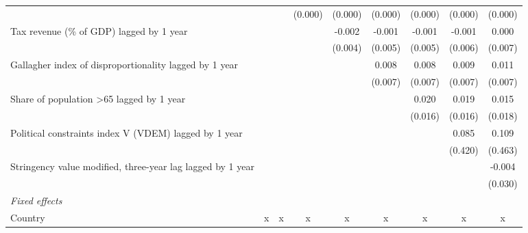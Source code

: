 \begin{tabular}{lcccccccc}
                                                              &              &              & (0.000)      & (0.000)      & (0.000)      & (0.000)      & (0.000)      & (0.000)\\   
   Tax revenue (\% of GDP) lagged by 1 year                   &              &              &              & -0.002       & -0.001       & -0.001       & -0.001       & 0.000\\   
                                                              &              &              &              & (0.004)      & (0.005)      & (0.005)      & (0.006)      & (0.007)\\   
   Gallagher index of disproportionality lagged by 1 year     &              &              &              &              & 0.008        & 0.008        & 0.009        & 0.011\\   
                                                              &              &              &              &              & (0.007)      & (0.007)      & (0.007)      & (0.007)\\   
   Share of population >65 lagged by 1 year                   &              &              &              &              &              & 0.020        & 0.019        & 0.015\\   
                                                              &              &              &              &              &              & (0.016)      & (0.016)      & (0.018)\\   
   Political constraints index V (VDEM) lagged by 1 year      &              &              &              &              &              &              & 0.085        & 0.109\\   
                                                              &              &              &              &              &              &              & (0.420)      & (0.463)\\   
   Stringency value modified, three-year lag lagged by 1 year &              &              &              &              &              &              &              & -0.004\\   
                                                              &              &              &              &              &              &              &              & (0.030)\\   
   \emph{Fixed effects}\\
   Country                                                    & x            & x            & x            & x            & x            & x            & x            & x\\  

\end{tabular}
